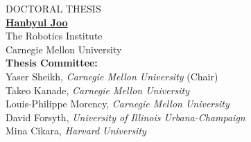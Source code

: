 \begin{center}
\textsc{\Large DOCTORAL  THESIS}\\[1cm]	
\vspace{1cm}
{\Large \href{http://cs.cmu.edu/~hanbyulj}{\textbf{Hanbyul Joo}}\\
\vspace{0.5cm}
The Robotics Institute\\
Carnegie Mellon University\\

\textbf{Thesis Committee:}\\
\large
Yaser Sheikh, \emph{Carnegie Mellon University} (Chair)\\
Takeo Kanade, \emph{Carnegie Mellon University} \\ 
Louis-Philippe Morency, \emph{Carnegie Mellon University}\\ 
David Forsyth, \emph{University of Illinois Urbana-Champaign}\\
Mina Cikara, \emph{Harvard University} 
}


\end{center}
